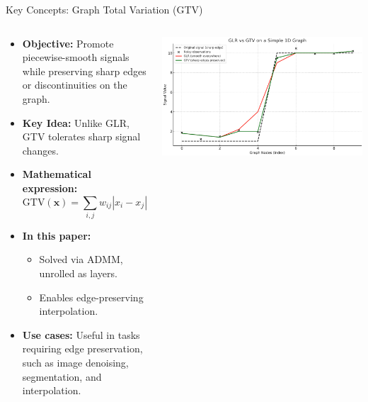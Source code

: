 \documentclass[aspectratio=169,xcolor=dvipsnames]{beamer}
\begin{document}
\begin{frame}{Key Concepts: Graph Total Variation (GTV)}

\begin{columns}[c]

\begin{column}{0.58\textwidth}

\begin{itemize}
    \item \textbf{Objective:} Promote piecewise-smooth signals while preserving sharp edges or discontinuities on the graph.
    
    \item \textbf{Key Idea:} Unlike GLR, GTV tolerates sharp signal changes.
    
    \item \textbf{Mathematical expression:}
    \[
        \text{GTV}(\mathbf{x}) = \sum_{i,j} w_{ij} |x_i - x_j|
    \]
    \vspace{-0.5cm}
    \item \textbf{In this paper:}
    \begin{itemize}
        \item Solved via ADMM, unrolled as layers.
        \item Enables edge-preserving interpolation.
    \end{itemize}
    \item \textbf{Use cases:}  
    Useful in tasks requiring edge preservation, such as image denoising, segmentation, and interpolation.

\end{itemize}

\end{column}

\begin{column}{0.4\textwidth}

\begin{center}
    \includegraphics[width=0.95\linewidth]{GLRvsGTV.png}
    \vspace{0.3cm}


\end{center}
\end{column}
\end{columns}
\end{frame}
\end{document}
